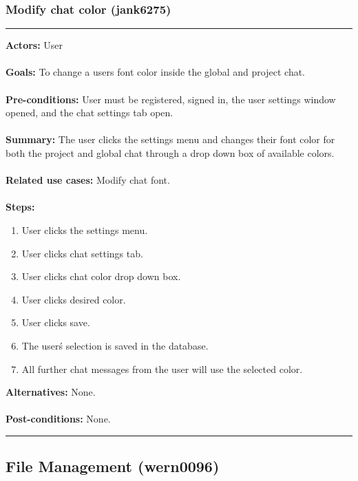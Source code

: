 \documentclass[11pt]{report}
\begin{document}
\subsubsection{Modify chat color (jank6275)}
\vspace{2pt}
\hrule
\vspace{8pt}
 \textbf{Actors:} User \\ \\
\textbf{Goals:} To change a users font color inside the global and project chat. \\ \\
 \textbf{Pre-conditions:} User must be registered, signed in, the user settings window opened, and the chat settings tab open.  \\ \\
 \textbf{Summary:} The user clicks the settings menu and changes their font color for both the project and global chat through a drop down box of available colors. \\ \\
\textbf{Related use cases:} Modify chat font. \\ \\
\textbf{Steps:} \begin{enumerate}
  \item User clicks the settings menu.
  \item User clicks chat settings tab.
  \item User clicks chat color drop down box.
  \item User clicks desired color.
  \item User clicks save.
  \item The user\'s selection is saved in the database.
  \item All further chat messages from the user will use the selected color.
 \end{enumerate}
 \textbf{Alternatives:} None. \\ \\
 \textbf{Post-conditions:} None. \\
\vspace{8pt}
\hrule

\newpage

\subsection{File Management (wern0096)}
\end{document}
